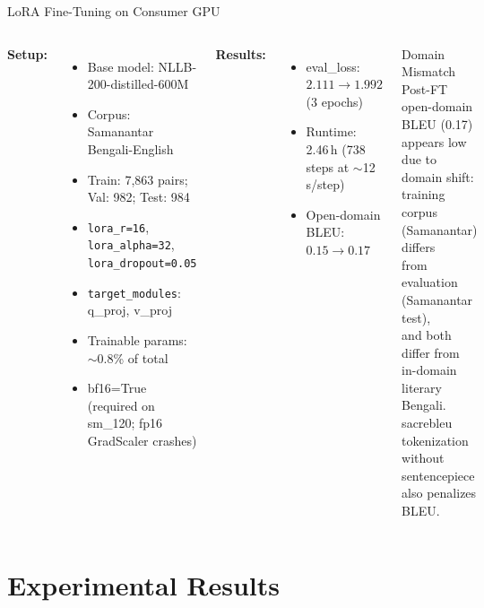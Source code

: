 \documentclass[aspectratio=169,10pt]{beamer}
\begin{document}
\begin{frame}{LoRA Fine-Tuning on Consumer GPU}
  \begin{columns}
    \textbf{Setup:}
    \begin{itemize}
      \item Base model: NLLB-200-distilled-600M
      \item Corpus: Samanantar Bengali-English
      \item Train: 7,863 pairs; Val: 982; Test: 984
      \item \texttt{lora\_r=16}, \texttt{lora\_alpha=32}, \texttt{lora\_dropout=0.05}
      \item \texttt{target\_modules}: q\_proj, v\_proj
      \item Trainable params: $\sim$0.8\% of total
      \item bf16=True (required on sm\_120; fp16 GradScaler crashes)
    \end{itemize}
    \vspace{0.15cm}
    \textbf{Results:}
    \begin{itemize}
      \item eval\_loss: $2.111 \to 1.992$ (3 epochs)
      \item Runtime: 2.46\,h (738 steps at $\sim$12\,s/step)
      \item Open-domain BLEU: $0.15 \to 0.17$
    \end{itemize}

    \begin{alertblock}{Domain Mismatch}
      Post-FT open-domain BLEU (0.17)\\
      appears low due to domain shift:\\
      training corpus (Samanantar) differs\\
      from evaluation (Samanantar test),\\
      and both differ from in-domain\\
      literary Bengali.\\
      \vspace{0.1cm}
      sacrebleu tokenization without\\
      sentencepiece also penalizes BLEU.
    \end{alertblock}
  \end{columns}
\end{frame}

\section{Experimental Results}
\end{document}

